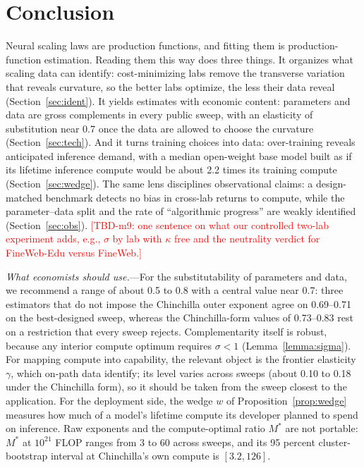 
\section{Conclusion}\label{sec:concl}

Neural scaling laws are production functions, and fitting them is production-function estimation. Reading
them this way does three things. It organizes what scaling data can identify: cost-minimizing labs remove
the transverse variation that reveals curvature, so the better labs optimize, the less their data reveal
(Section~\ref{sec:ident}). It yields estimates with economic content: parameters and data are gross
complements in every public sweep, with an elasticity of substitution near 0.7 once the data are allowed to
choose the curvature (Section~\ref{sec:tech}). And it turns training choices into data: over-training reveals
anticipated inference demand, with a median open-weight base model built as if its lifetime inference compute
would be about 2.2 times its training compute (Section~\ref{sec:wedge}). The same lens disciplines
observational claims: a design-matched benchmark detects no bias in cross-lab returns to compute, while the
parameter--data split and the rate of ``algorithmic progress'' are weakly identified (Section~\ref{sec:obs}).
\textcolor{red}{[TBD-m9: one sentence on what our controlled two-lab experiment adds, e.g., $\sigma$ by lab with
$\kappa$ free and the neutrality verdict for FineWeb-Edu versus FineWeb.]}

\emph{What economists should use.}---For the substitutability of parameters and data, we recommend a range of
about 0.5 to 0.8 with a central value near 0.7: three estimators that do not impose the Chinchilla outer
exponent agree on 0.69--0.71 on the best-designed sweep, whereas the Chinchilla-form values of 0.73--0.83 rest
on a restriction that every sweep rejects. Complementarity itself is robust, because any interior compute
optimum requires $\sigma<1$ (Lemma~\ref{lemma:sigma}). For mapping compute into capability, the relevant object
is the frontier elasticity $\gamma$, which on-path data identify; its level varies across sweeps (about 0.10 to
0.18 under the Chinchilla form), so it should be taken from the sweep closest to the application. For the
deployment side, the wedge $w$ of Proposition~\ref{prop:wedge} measures how much of a model's lifetime compute
its developer planned to spend on inference. Raw exponents and the compute-optimal ratio $M^*$ are not portable:
$M^*$ at $10^{21}$ FLOP ranges from 3 to 60 across sweeps, and its 95 percent cluster-bootstrap interval at
Chinchilla's own compute is $[3.2,126]$.

